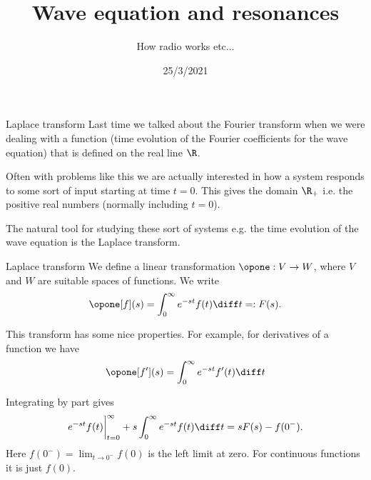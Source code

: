 

\title{Wave equation and resonances}
\subtitle{How radio works etc...}
\date{25/3/2021}
\date{}


	
	\maketitle
	

\begin{frame}{Laplace transform}
	Last time we talked about the Fourier transform when we were dealing with a function (time evolution of the Fourier coefficients for the wave equation) that is defined on the real line $ \R $. 
	
	\pause
	Often with problems like this we are actually interested in how a system responds to some sort of input starting at time $ t=0 $. This gives the domain $ \R_{+} $ i.e. the positive real numbers (normally including $ t=0 $). 
	
	\pause
	The natural tool for studying these sort of systems e.g. the time evolution of the wave equation is the \alert{Laplace transform}. 
\end{frame}

\begin{frame}{Laplace transform}
	We define a linear transformation $ \opone:  V \to W $, where $ V $ and $ W $ are suitable spaces of functions. We write
	\[ \opone[f](s) = \int_{0}^{\infty} e^{-st} f(t) \diff t =: F(s). \]
	
	\pause
	This transform has some nice properties. For example, for derivatives of a function we have
	\[ \opone [f'](s) = \int_{0}^{\infty} e^{-st} f'(t) \diff t \]
	
	\pause
	Integrating by part gives 
	\[ e^{-st} f(t)\biggr|_{t=0}^{\infty} + s \int_{0}^{\infty} e^{-st} f(t) \diff t = s F(s) - f(0^{-}). \]
	Here $ f(0^{-}) = \lim_{t\to 0^{-}} f(0) $ is the left limit at zero. For continuous functions it is just $ f(0) $. 
\end{frame}

